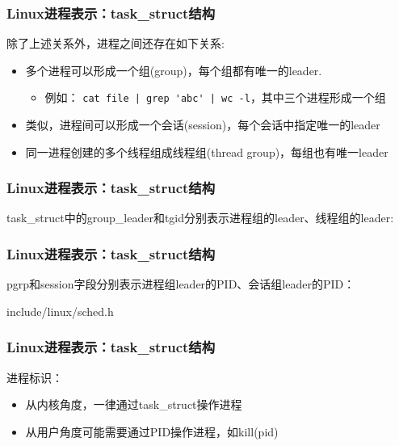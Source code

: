 \documentclass[xcolor=svgnames]{beamer}
\begin{document}
\begin{CJK*}{UTF8}{gbsn}
\begin{frame}[fragile]
\frametitle{Linux进程表示：task\_struct结构}
除了上述关系外，进程之间还存在如下关系:
\begin{itemize}
\item 多个进程可以形成一个组(group)，每个组都有唯一的leader.
\begin{itemize}
\item 例如： \verb=cat file | grep 'abc' | wc -l=，其中三个进程形成一个组
\end{itemize}
\item 类似，进程间可以形成一个会话(session)，每个会话中指定唯一的leader
\item 同一进程创建的多个线程组成线程组(thread group)，每组也有唯一leader
\end{itemize}
\end{frame}

\begin{frame}[fragile]
\frametitle{Linux进程表示：task\_struct结构}
task\_struct中的group\_leader和tgid分别表示进程组的leader、线程组的leader:

\lstotherrelations
\end{frame}

\begin{frame}[fragile]
\frametitle{Linux进程表示：task\_struct结构}
pgrp和session字段分别表示进程组leader的PID、会话组leader的PID：
\begin{block}{include/linux/sched.h}
\lstsignalstruct
\end{block}
\end{frame}

\begin{frame}[fragile]
\frametitle{Linux进程表示：task\_struct结构}
进程标识：

\begin{itemize}
\item 从内核角度，一律通过task\_struct操作进程
\item 从用户角度可能需要通过PID操作进程，如kill(pid)
\end{itemize}


\end{frame}
\end{CJK*}
\end{document}
